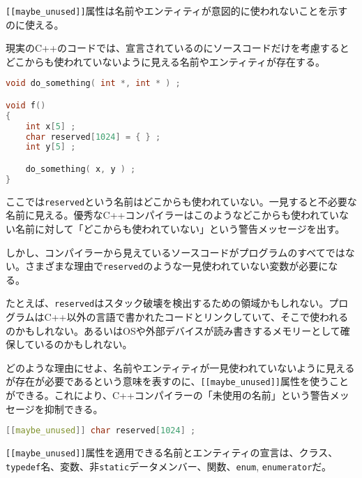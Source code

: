 %

\lstinline![[maybe_unused]]!属性は名前やエンティティが意図的に使われないことを示すのに使える。

現実のC++のコードでは、宣言されているのにソースコードだけを考慮するとどこからも使われていないように見える名前やエンティティが存在する。

\begin{lstlisting}[language=C++]
void do_something( int *, int * ) ;

void f()
{
    int x[5] ;
    char reserved[1024] = { } ;
    int y[5] ;

    do_something( x, y ) ;
}
\end{lstlisting}

ここでは\lstinline!reserved!という名前はどこからも使われていない。一見すると不必要な名前に見える。優秀なC++コンパイラーはこのようなどこからも使われていない名前に対して「どこからも使われていない」という警告メッセージを出す。

しかし、コンパイラーから見えているソースコードがプログラムのすべてではない。さまざまな理由で\lstinline!reserved!のような一見使われていない変数が必要になる。

たとえば、\lstinline!reserved!はスタック破壊を検出するための領域かもしれない。プログラムはC++以外の言語で書かれたコードとリンクしていて、そこで使われるのかもしれない。あるいはOSや外部デバイスが読み書きするメモリーとして確保しているのかもしれない。

どのような理由にせよ、名前やエンティティが一見使われていないように見えるが存在が必要であるという意味を表すのに、\lstinline![[maybe_unused]]!属性を使うことができる。これにより、C++コンパイラーの「未使用の名前」という警告メッセージを抑制できる。

\begin{lstlisting}[language=C++]
[[maybe_unused]] char reserved[1024] ;
\end{lstlisting}

\lstinline![[maybe_unused]]!属性を適用できる名前とエンティティの宣言は、クラス、\lstinline!typedef!名、変数、非\lstinline!static!データメンバー、関数、\lstinline!enum!,
\lstinline!enumerator!だ。

